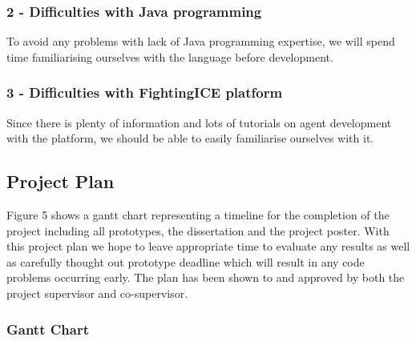 \documentclass[11pt,a4paper]{article}
\begin{document}
\subsubsection*{2 - Difficulties with Java programming}
To avoid any problems with lack of Java programming expertise, we will spend time familiarising ourselves with the language before development.
\subsubsection*{3 - Difficulties with FightingICE platform}
Since there is plenty of information and lots of tutorials on agent development with the platform, we should be able to easily familiarise ourselves with it.
\newpage
\subsection{Project Plan}
Figure 5 shows a gantt chart representing a timeline for the completion of the project including all prototypes, the dissertation and the project poster. With this project plan we hope to leave appropriate time to evaluate any results as well as carefully thought out prototype deadline which will result in any code problems occurring early. The plan has been shown to and approved by both the project supervisor and co-supervisor.
\newpage
\begin{landscape}
{\centering
\subsubsection{Gantt Chart}
}
\vspace{10mm}
\begin{ganttchart}{1}{24}
	 \\
	\\
	\\
	\\
	\\
	\\
	\\
	\\
	\\
	\\
	\\
	\\
\end{ganttchart}	
\end{landscape}
\newpage
\end{document}
